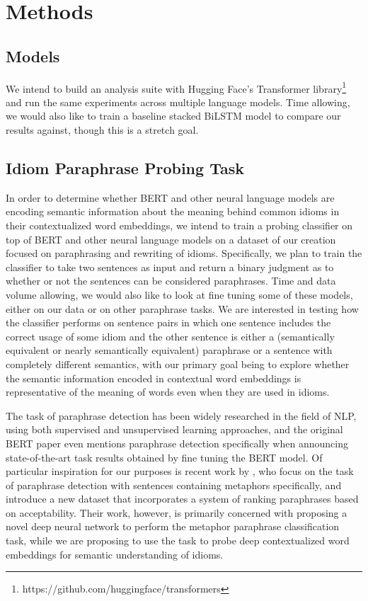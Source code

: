 \documentclass[11pt,a4paper]{article}
\begin{document}
\section{Methods}
\subsection{Models}
We intend to build an analysis suite with Hugging Face's Transformer library\footnote{https://github.com/huggingface/transformers} and run the same experiments across multiple language models. Time allowing, we would also like to train a baseline stacked BiLSTM model to compare our results against, though this is a stretch goal.
\subsection{Idiom Paraphrase Probing Task}
In order to determine whether BERT and other neural language models are encoding semantic information about the meaning behind common idioms in their contextualized word embeddings, we intend to train a probing classifier on top of BERT and other neural language models on a dataset of our creation focused on paraphrasing and rewriting of idioms. Specifically, we plan to train the classifier to take two sentences as input and return a binary judgment as to whether or not the sentences can be considered paraphrases. Time and data volume allowing, we would also like to look at fine tuning some of these models, either on our data or on other paraphrase tasks. We are interested in testing how the classifier performs on sentence pairs in which one sentence includes the correct usage of some idiom and the other sentence is either a (semantically equivalent or nearly semantically equivalent) paraphrase or a sentence with completely different semantics, with our primary goal being to explore whether the semantic information encoded in contextual word embeddings is representative of the meaning of words even when they are used in idioms. 

The task of paraphrase detection has been widely researched in the field of NLP, using both supervised and unsupervised learning approaches, and the original BERT paper \citep{devlin2018bert} even mentions paraphrase detection specifically when announcing state-of-the-art task results obtained by fine tuning the BERT model.
Of particular inspiration for our purposes is recent work by \citet{bizzoni-lappin-2018-predicting}, who focus on the task of paraphrase detection with sentences containing metaphors specifically, and introduce a new dataset that incorporates a system of ranking paraphrases based on acceptability. Their work, however, is primarily concerned with proposing a novel deep neural network to perform the metaphor paraphrase classification task, while we are proposing to use the task to probe deep contextualized word embeddings for semantic understanding of idioms. 
\end{document}
